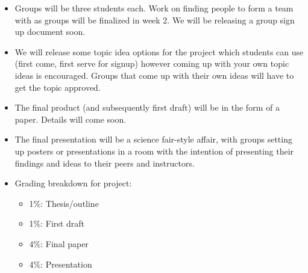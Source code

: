     \begin{itemize}
        \item Groups will be three students each. Work on finding people to form a team with as groups will be finalized in week 2. We will be releasing a group sign up document soon.
        \item We will release some topic idea options for the project which students can use (first come, first serve for signup) however coming up with your own topic ideas is encouraged. Groups that come up with their own ideas will have to get the topic approved.
        \item The final product (and subsequently first draft) will be in the form of a paper. Details will come soon.
        \item The final presentation will be a science fair-style affair, with groups setting up posters or presentations in a room with the intention of presenting their findings and ideas to their peers and instructors.
        \item Grading breakdown for project:
            \begin{itemize}
                \item 1\%: Thesis/outline
                \item 1\%: First draft
                \item 4\%: Final paper
                \item 4\%: Presentation
            \end{itemize}
    \end{itemize}